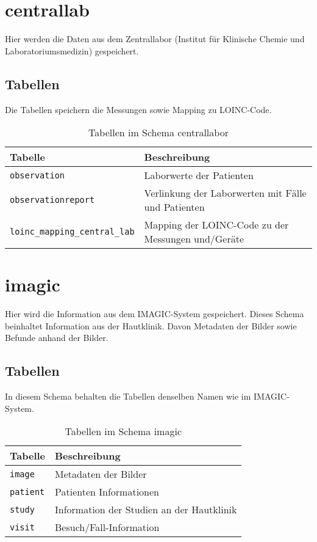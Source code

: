   \section{centrallab}
  Hier werden die Daten aus dem Zentrallabor (Institut für Klinische Chemie und Laboratoriumsmedizin) gespeichert.
  \subsection{Tabellen}
  Die Tabellen speichern die Messungen sowie Mapping zu LOINC-Code.
  \begin{table}[ht]
  	\centering
  	\caption{Tabellen im Schema centrallabor}
  	\begin{tabular}{|| l | l ||}
  		\hline
  		Tabelle & Beschreibung \\[0.5ex]
  		\hline\hline
  		\texttt{observation} & Laborwerte der Patienten \\
  		\hline
  		\texttt{observationreport} & Verlinkung der Laborwerten mit Fälle und Patienten \\
  		\hline
  		\texttt{loinc\_mapping\_central\_lab} & Mapping der LOINC-Code zu der Messungen und/Geräte \\
  		\hline
  	\end{tabular}
  \end{table}

\section{imagic}
Hier wird die Information aus dem IMAGIC-System gespeichert. Dieses Schema beinhaltet Information aus der Hautklinik. Davon Metadaten der Bilder sowie Befunde anhand der Bilder.
\subsection{Tabellen}
In diesem Schema behalten die Tabellen denselben Namen wie im IMAGIC-System. 
\begin{table}[ht]
	\centering   
	\caption{Tabellen im Schema imagic}
	\begin{tabular}{||l|l||}   		
		\hline
		Tabelle & Beschreibung \\ [0.5ex]
		\hline\hline
		\texttt{image} & Metadaten der Bilder \\
		\hline
		\texttt{patient} & Patienten Informationen \\
		\hline
		\texttt{study} & Information der Studien an der Hautklinik \\
		\hline
		\texttt{visit} &  Besuch/Fall-Information\\
		\hline
	\end{tabular}
\end{table}

